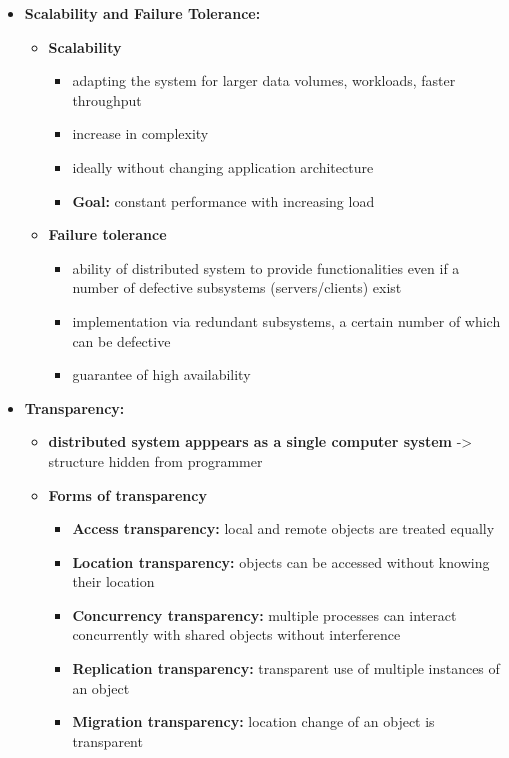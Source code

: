 \documentclass[ieeetran]{article}
\begin{document}
\begin{itemize}
\begin{itemize}
	\end{itemize}
\item \textbf{Scalability and Failure Tolerance:}
	\begin{itemize}
	  \item \textbf{Scalability}
		  \begin{itemize}
		    \item adapting the system for larger data volumes, workloads, faster throughput
		\item increase in complexity
		\item ideally without changing application architecture
		\item \textbf{Goal:} constant performance with increasing load
		  \end{itemize}

\item \textbf{Failure tolerance}
	\begin{itemize}
	  \item ability of distributed system to provide functionalities even if a number of defective subsystems (servers/clients) exist
\item implementation via redundant subsystems, a certain number of which can be defective
\item guarantee of high availability
	\end{itemize}
	\end{itemize}

\item \textbf{Transparency:}
	\begin{itemize}
	  \item \textbf{distributed system apppears as a single computer system} -> structure hidden from programmer
	\item \textbf{Forms of transparency}
		\begin{itemize}
			\item \textbf{Access transparency:} local and remote objects are treated equally
				\item \textbf{Location transparency:} objects can be accessed without knowing their location
					\item \textbf{Concurrency transparency:} multiple processes can interact concurrently with shared objects without interference
					\item \textbf{Replication transparency:} transparent use of multiple instances of an object
					\item \textbf{Migration transparency:} location change of an object is transparent
		\end{itemize}
	\end{itemize}


\end{itemize}
\end{document}
